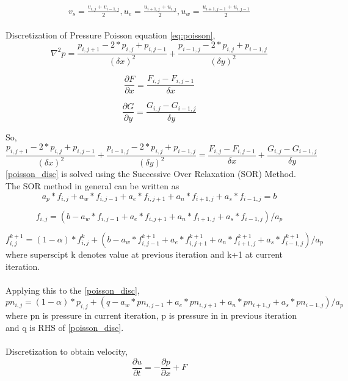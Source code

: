 \documentclass{article}
\begin{document}
\begin{equation*}
\begin{aligned}
\begin{gathered}
v_{s} = \frac{v_{i,j} + v_{i-1,j}}{2},
u_{e} = \frac{u_{i+1,j} + u_{i,j}}{2},
u_{w} = \frac{u_{i+1,j-1} + u_{i,j-1}}{2}
\end{gathered}
\end{aligned}
\end{equation*}

Discretization of Pressure Poisson equation \ref{eq:poisson},
\begin{equation}
    \nabla^2 p =  \frac{p_{i,j+1} - 2*p_{i,j} + p_{i,j-1}}{(\delta x)^2} + \frac{p_{i-1,j} - 2*p_{i,j} + p_{i-1,j}}{(\delta y)^2}
\end{equation}

\begin{equation}
    \frac{\partial F}{\partial x} = \frac{F_{i,j} - F_{i,j-1}}{\delta x}
\end{equation}

\begin{equation}
    \frac{\partial G}{\partial y} = \frac{G_{i,j} - G_{i-1,j}}{\delta y}
\end{equation}

So, 
\begin{equation}\label{poisson_disc}
    \frac{p_{i,j+1} - 2*p_{i,j} + p_{i,j-1}}{(\delta x)^2} + \frac{p_{i-1,j} - 2*p_{i,j} + p_{i-1,j}}{(\delta y)^2} = \frac{F_{i,j} - F_{i,j-1}}{\delta x} + \frac{G_{i,j} - G_{i-1,j}}{\delta y}
\end{equation}
\ref{poisson_disc} is solved using the Successive Over Relaxation (SOR) Method. The SOR method in general can be written as
\begin{equation}
a_{p}*f_{i,j} + a_{w}*f_{i,j-1} + a_{e}*f_{i,j+1} + a_{n}*f_{i+1,j} + a_{s}*f_{i-1,j} = b
\end{equation}

\begin{equation}
f_{i,j} = (b - a_{w}*f_{i,j-1} + a_{e}*f_{i,j+1} + a_{n}*f_{i+1,j} + a_{s}*f_{i-1,j})/a_{p}
\end{equation}

\begin{equation}
f_{i,j}^{k+1} = (1 - \alpha)*f_{i,j}^k + (b - a_{w}*f_{i,j-1}^{k+1} + a_{e}*f_{i,j+1}^{k+1} + a_{n}*f_{i+1,j}^{k+1} + a_{s}*f_{i-1,j}^{k+1})/a_{p}
\end{equation}
where superscipt k denotes value at previous iteration and k+1 at current iteration.
\\\\Applying this to the \ref{poisson_disc}, 
\begin{equation}
pn_{i,j} = (1 - \alpha)*p_{i,j} + (q - a_{w}*pn_{i,j-1} + a_{e}*pn_{i,j+1} + a_{n}*pn_{i+1,j} + a_{s}*pn_{i-1,j})/a_{p}
\end{equation}
where pn is pressure in current iteration, p is pressure in in previous iteration and q is RHS of \ref{poisson_disc}.
\\\\Discretization to obtain velocity,
\begin{equation}
\frac{\partial u}{\partial t} = -\frac{\partial p}{\partial x} + F
\end{equation}
\end{document}
